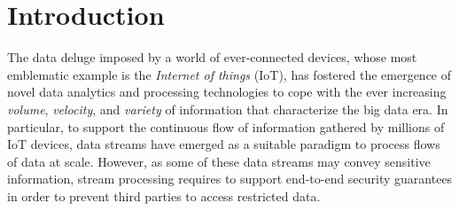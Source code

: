 \section{Introduction}\label{sec:introduction}

The data deluge imposed by a world of ever-connected devices, whose most emblematic example is the \emph{Internet of things} (IoT), has fostered the emergence of novel data analytics and processing technologies to cope with the ever increasing \emph{volume}, \emph{velocity}, and \emph{variety} of information that characterize the big data era.
In particular, to support the continuous flow of information gathered by millions of IoT devices, data streams have emerged as a suitable paradigm to process flows of data at scale.
However, as some of these data streams may convey sensitive information, stream processing requires to support end-to-end security guarantees in order to prevent third parties to access restricted data.


